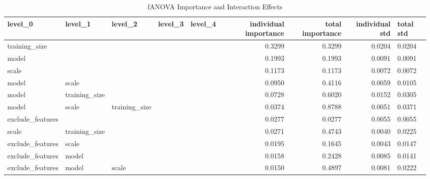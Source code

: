 \begin{table}
\centering
\caption{fANOVA Importance and Interaction Effects}
\label{tab:fanova_importance}
\begin{tabular}{llllrrrr}
\toprule
          level\_0 &           level\_1 &       level\_2 &       level\_3 &       level\_4 & individual importance & total importance & individual std & total std \\
\midrule
    training\_size &                   &               &               &               &                0.3299 &           0.3299 &         0.0204 &    0.0204 \\
            model &                   &               &               &               &                0.1993 &           0.1993 &         0.0091 &    0.0091 \\
            scale &                   &               &               &               &                0.1173 &           0.1173 &         0.0072 &    0.0072 \\
            model &             scale &               &               &               &                0.0950 &           0.4116 &         0.0059 &    0.0105 \\
            model &     training\_size &               &               &               &                0.0728 &           0.6020 &         0.0152 &    0.0305 \\
            model &             scale & training\_size &               &               &                0.0374 &           0.8788 &         0.0051 &    0.0371 \\
 exclude\_features &                   &               &               &               &                0.0277 &           0.0277 &         0.0055 &    0.0055 \\
            scale &     training\_size &               &               &               &                0.0271 &           0.4743 &         0.0040 &    0.0225 \\
 exclude\_features &             scale &               &               &               &                0.0195 &           0.1645 &         0.0043 &    0.0147 \\
 exclude\_features &             model &               &               &               &                0.0158 &           0.2428 &         0.0085 &    0.0141 \\
 exclude\_features &             model &         scale &               &               &                0.0150 &           0.4897 &         0.0081 &    0.0222 \\

\end{tabular}
\end{table}
